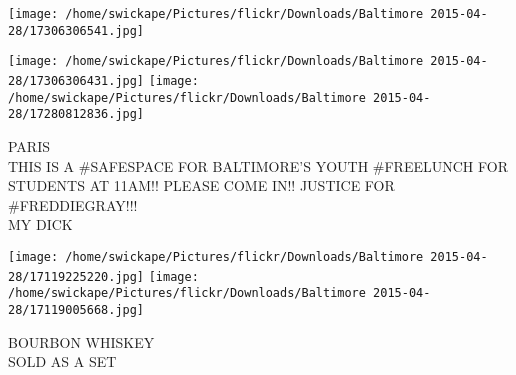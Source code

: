 \documentclass[10pt,letterpaper]{article}
\begin{document}
\texttt{[image: /home/swickape/Pictures/flickr/Downloads/Baltimore 2015-04-28/17306306541.jpg]}

\vspace{0.25in}
\texttt{[image: /home/swickape/Pictures/flickr/Downloads/Baltimore 2015-04-28/17306306431.jpg]}
\texttt{[image: /home/swickape/Pictures/flickr/Downloads/Baltimore 2015-04-28/17280812836.jpg]}

PARIS\\
THIS IS A \#SAFESPACE FOR BALTIMORE'S YOUTH \#FREELUNCH FOR STUDENTS AT 11AM!!  PLEASE COME IN!!  JUSTICE FOR \#FREDDIEGRAY!!!\\
MY DICK
\pagebreak

\texttt{[image: /home/swickape/Pictures/flickr/Downloads/Baltimore 2015-04-28/17119225220.jpg]}
\texttt{[image: /home/swickape/Pictures/flickr/Downloads/Baltimore 2015-04-28/17119005668.jpg]}

BOURBON WHISKEY\\
SOLD AS A SET
\pagebreak
\end{document}

